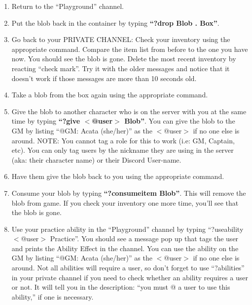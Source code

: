 \documentclass[green]{TMFHope}
\begin{document}
\begin{enumerate}
	\item Return to the ``Playground'' channel.
	\item Put the blob back in the container by typing \textbf{``?drop Blob . Box''}.
	\item Go back to your PRIVATE CHANNEL: Check your inventory using the appropriate command. Compare the item list from before to the one you have now. You should see the blob is gone. Delete the most recent inventory by reacting ``check mark''. Try it with the older messages and notice that it doesn't work if those messages are more than 10 seconds old.
	\item Take a blob from the box again using the appropriate command.
	\item Give the blob to another character who is on the server with you at the same time by typing \textbf{``?give $<$@user$>$ Blob''}. You can give the blob to the GM by listing ``@GM: Acata (she/her)'' as the $<$@user$>$ if no one else is around. NOTE: You cannot tag a role for this to work (i.e: GM, Captain, etc). You can only tag users by the nickname they are using in the server (aka: their character name) or their Discord User-name.
	\item Have them give the blob back to you using the appropriate command.
	\item Consume your blob by typing \textbf{``?consumeitem Blob''}. This will remove the blob from game. If you check your inventory one more time, you'll see that the blob is gone.
	\item Use your practice ability in the ``Playground'' channel by typing ``?useability $<$@user$>$ Practice''. You should see a message pop up that tags the user and prints the Ability Effect in the channel. You can use the ability on the GM by listing ``@GM: Acata (she/her)'' as the $<$@user$>$ if no one else is around. Not all abilities will require a user, so don't forget to use ``?abilities'' in your private channel if you need to check whether an ability requires a user or not. It will tell you in the description: ``you must @ a user to use this ability,'' if one is necessary.
\end{enumerate}
\end{document}
